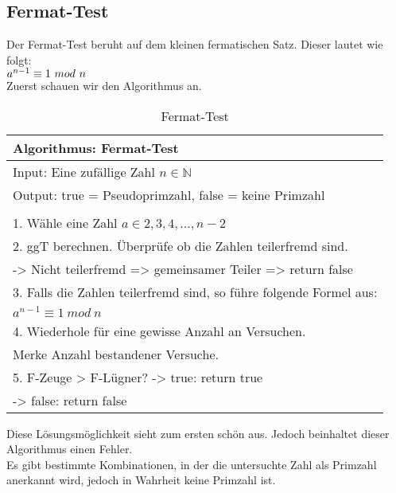 \subsection{Fermat-Test}

Der Fermat-Test beruht auf dem kleinen fermatischen Satz. Dieser lautet wie folgt:
\\
$
                    a^{n-1} \equiv  1\ mod\ n\\
$
\\
Zuerst schauen wir den Algorithmus an.\\
\begin{table}[!ht]
    \centering
        \begin{tabular}{l}
            \toprule
            \textbf{Algorithmus: Fermat-Test}\\
            \midrule
            Input: Eine zufällige Zahl $n \in \mathbb{N} $\\
            Output: true = Pseudoprimzahl, false = keine Primzahl  \\
                                                       \\
                                                       
            1. Wähle eine Zahl $ a \in {2,3,4,...,n-2}$ \\
            2. ggT berechnen. Überprüfe ob die Zahlen teilerfremd sind.\\ 
                -> Nicht teilerfremd => gemeinsamer Teiler => return false \\
            3. Falls die Zahlen teilerfremd sind, so führe folgende Formel aus:\\
                $
                    a^{n-1} \equiv  1\ mod\ n
                $\\
            4. Wiederhole für eine gewisse Anzahl an Versuchen.\\
                Merke Anzahl bestandener Versuche.\\
                
            5. F-Zeuge > F-Lügner?    
            -> true: return true \\
            -> false: return false\\
           \bottomrule
        \end{tabular}
        \caption{Fermat-Test}
        \label{tab3}
    \end{table}

Diese Lösungsmöglichkeit sieht zum ersten schön aus. Jedoch beinhaltet dieser Algorithmus einen Fehler.\\
Es gibt bestimmte Kombinationen, in der die untersuchte Zahl als Primzahl anerkannt wird, jedoch in Wahrheit keine Primzahl ist.\\

